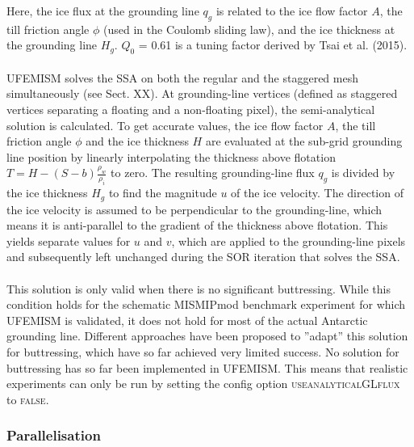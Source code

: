 \documentclass{article}
\begin{document}
Here, the ice flux at the grounding line $q_g$ is related to the ice flow factor $A$, the till friction angle $\phi$ (used in the Coulomb sliding law), and the ice thickness at the grounding line $H_g$. $Q_0$ = 0.61 is a tuning factor derived by Tsai et al. (2015).\\
\\
UFEMISM solves the SSA on both the regular and the staggered mesh simultaneously (see Sect. XX). At grounding-line vertices (defined as staggered vertices separating a floating and a non-floating pixel), the semi-analytical solution is calculated. To get accurate values, the ice flow factor $A$, the till friction angle $\phi$ and the ice thickness $H$ are evaluated at the sub-grid grounding line position by linearly interpolating the thickness above flotation $T = H - \left( S - b\right) \frac{\rho_w}{\rho_i}$ to zero. The resulting grounding-line flux $q_g$ is divided by the ice thickness $H_g$ to find the magnitude $u$ of the ice velocity. The direction of the ice velocity is assumed to be perpendicular to the grounding-line, which means it is anti-parallel to the gradient of the thickness above flotation. This yields separate values for $u$ and $v$, which are applied to the grounding-line pixels and subsequently left unchanged during the SOR iteration that solves the SSA.\\
\\
This solution is only valid when there is no significant buttressing. While this condition holds for the schematic MISMIP\textunderscore mod benchmark experiment for which UFEMISM is validated, it does not hold for most of the actual Antarctic grounding line. Different approaches have been proposed to ''adapt'' this solution for buttressing, which have so far achieved very limited success. No solution for buttressing has so far been implemented in UFEMISM. This means that realistic experiments can only be run by setting the config option \textsc{use\textunderscore analytical\textunderscore GL\textunderscore flux} to \textsc{false}.

\subsubsection{Parallelisation}
\end{document}

